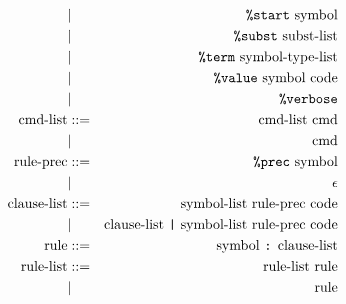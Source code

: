 \documentclass{article}
\begin{document}
\begin{eqnarray*}
 & | & \mbox{{\tt \%start} symbol} \\
 & | & \mbox{{\tt \%subst} subst-list} \\
 & | & \mbox{{\tt \%term} symbol-type-list} \\
 & | & \mbox{{\tt \%value} symbol code} \\
 & | & \mbox{{\tt \%verbose}} \\
\mbox{cmd-list} & ::= &\mbox{ cmd-list cmd} \\
 & | & \mbox{cmd} \\
\mbox{rule-prec} & ::= & \mbox{{\tt \%prec} symbol} \\
            &  | & \epsilon \\
\mbox{clause-list} & ::= & \mbox{symbol-list rule-prec code} \\
              &  | &  \mbox{clause-list {\tt |} symbol-list rule-prec code} \\
\mbox{rule} & ::= & \mbox{symbol {\tt :} clause-list} \\
\mbox{rule-list} & ::= & \mbox{rule-list rule} \\
            &  |  & \mbox{rule} 
\end{eqnarray*}
\end{document}
